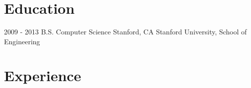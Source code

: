 \documentclass[letterpaper]{twentysecondcv} %
\begin{document}
\makeprofile %

\section{Education}

\begin{twenty} %
	\twentyitem
    	{2009 - 2013}
		{}
        {B.S. Computer Science}
        {Stanford, CA}
        {}
        {Stanford University, School of Engineering}
\end{twenty}


\section{Experience}
\end{document}
